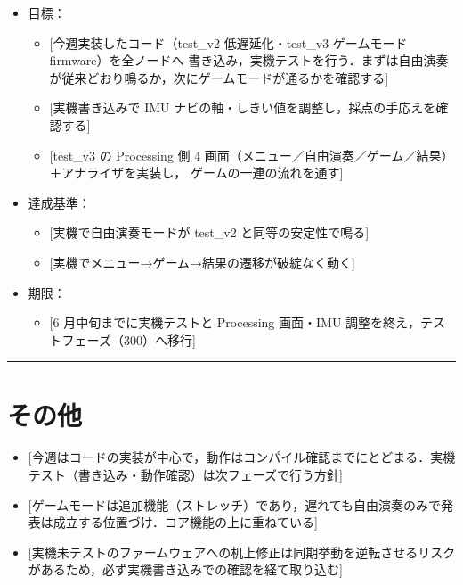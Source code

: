 \documentclass[uplatex,dvipdfmx,a4paper,11pt]{jsarticle}
\newcommand{\sectionrule}{\par\medskip\noindent\rule{\linewidth}{0.6pt}\par\medskip}
\begin{document}
\begin{itemize}
  \item 目標：
    \begin{itemize}
      \item {}[今週実装したコード（test\_v2 低遅延化・test\_v3 ゲームモード firmware）を全ノードへ
            書き込み，実機テストを行う．まずは自由演奏が従来どおり鳴るか，次にゲームモードが通るかを確認する]
      \item {}[実機書き込みで IMU ナビの軸・しきい値を調整し，採点の手応えを確認する]
      \item {}[test\_v3 の Processing 側 4 画面（メニュー／自由演奏／ゲーム／結果）＋アナライザを実装し，
            ゲームの一連の流れを通す]
    \end{itemize}
  \item 達成基準：
    \begin{itemize}
      \item {}[実機で自由演奏モードが test\_v2 と同等の安定性で鳴る]
      \item {}[実機でメニュー→ゲーム→結果の遷移が破綻なく動く]
    \end{itemize}
  \item 期限：
    \begin{itemize}
      \item {}[6 月中旬までに実機テストと Processing 画面・IMU 調整を終え，テストフェーズ（300）へ移行]
    \end{itemize}
\end{itemize}

\sectionrule

\section{その他}

\begin{itemize}
  \item {}[今週はコードの実装が中心で，動作はコンパイル確認までにとどまる．実機テスト（書き込み・動作確認）は次フェーズで行う方針]
  \item {}[ゲームモードは追加機能（ストレッチ）であり，遅れても自由演奏のみで発表は成立する位置づけ．コア機能の上に重ねている]
  \item {}[実機未テストのファームウェアへの机上修正は同期挙動を逆転させるリスクがあるため，必ず実機書き込みでの確認を経て取り込む]
\end{itemize}
\end{document}
